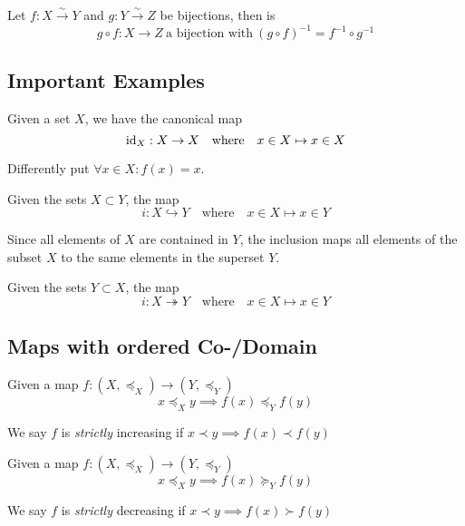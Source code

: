 \begin{proposition}
   Let \(f: X \xrightarrow{\sim} Y\) and \(g: Y \xrightarrow{\sim} Z\) be bijections, then is
   \[g \circ f: X \to Z~\text{a bijection with}~(g \circ f)^{-1} = f^{-1} \circ g^{-1}\]
\end{proposition}

\subsection{Important Examples}
\begin{definition}
   Given a set \(X\), we have the canonical map
   \[\operatorname{id}_X: X \to X \quad\text{where}\quad x \in X \mapsto x \in X\]
\end{definition}
\begin{remark}[Intuition]
   Differently put \(\forall x \in X: f(x) = x\).
\end{remark}

\begin{definition}
   Given the sets \(X \subset Y\), the map
   \[i: X \hookrightarrow Y \quad\text{where}\quad x \in X \mapsto x \in Y\]
\end{definition}
\begin{remark}[Intuition]
   Since all elements of \(X\) are contained in \(Y\), the inclusion maps all elements of the subset \(X\) to the same elements in the superset \(Y\).
\end{remark}

\begin{definition}\label{def:projection}
   Given the sets \(Y \subset X\), the map
   \[i: X \twoheadrightarrow Y \quad\text{where}\quad x \in X \mapsto x \in Y\]
\end{definition}

\subsection{Maps with ordered Co-/Domain}
\begin{definition}
   Given a map \(f: (X, \preceq_X) \to (Y, \preceq_Y)\)
   \[x \preceq_X y \implies f(x) \preceq_Y f(y)\]
\end{definition}
\begin{remark}
   We say \(f\) is \textit{strictly} increasing if \(x \prec y \implies f(x) \prec f(y)\)
\end{remark}

\begin{definition}
   Given a map \(f: (X, \preceq_X) \to (Y, \preceq_Y)\)
   \[x \preceq_X y \implies f(x) \succeq_Y f(y)\]
\end{definition}
\begin{remark}
   We say \(f\) is \textit{strictly} decreasing if \(x \prec y \implies f(x) \succ f(y)\)
\end{remark}

